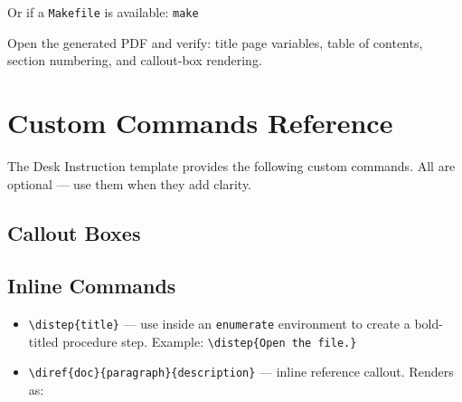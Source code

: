 {\begin{enumerate}
Or if a \texttt{Makefile} is available: \texttt{make}

Open the generated PDF and verify: title page variables, table of contents, section numbering, and callout-box rendering.

\end{enumerate}

\section{Custom Commands Reference}
\label{sec:commands}

The Desk Instruction template provides the following custom commands. All are optional --- use them when they add clarity.

\subsection{Callout Boxes}






\subsection{Inline Commands}

\begin{itemize}
\item \texttt{\textbackslash{}distep\{title\}} --- use inside an \texttt{enumerate} environment to create a bold-titled procedure step. Example: \texttt{\textbackslash{}distep\{Open the file.\}}
\item \texttt{\textbackslash{}diref\{doc\}\{paragraph\}\{description\}} --- inline reference callout. Renders as:\\
\end{itemize}

}
